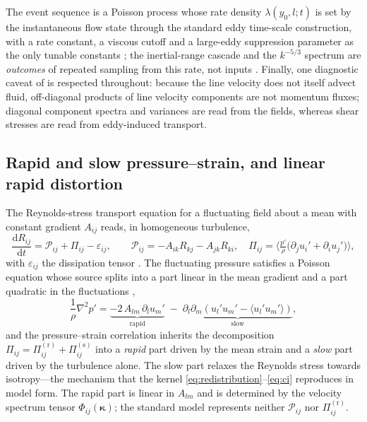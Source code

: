 \documentclass[lineno]{JFM-FLM_Au}
\begin{document}
The event sequence is a Poisson process whose rate density
$\lambda(y_0,l;t)$ is set by the instantaneous flow state through the
standard eddy time-scale construction, with a rate constant, a viscous
cutoff and a large-eddy suppression parameter as the only tunable
constants \citep{Kerstein1999,StephensLignell2021}; the inertial-range
cascade and the $k^{-5/3}$ spectrum are \emph{outcomes} of repeated
sampling from this rate, not inputs \citep{Kerstein1999}. Finally, one
diagnostic caveat of \citet{Kerstein2001} is respected throughout:
because the line velocity does not itself advect fluid, off-diagonal
products of line velocity components are not momentum fluxes; diagonal
component spectra and variances are read from the fields, whereas shear
stresses are read from eddy-induced transport.

\subsection{Rapid and slow pressure--strain, and linear rapid
distortion}\label{sec:rapid-slow}

The Reynolds-stress transport equation for a fluctuating field about a
mean with constant gradient $A_{ij}$ reads, in homogeneous turbulence,
\begin{equation}
  \frac{\mathrm{d}R_{ij}}{\mathrm{d}t}
  = \mathcal{P}_{ij} + \Pi_{ij} - \varepsilon_{ij},
  \qquad
  \mathcal{P}_{ij}=-A_{ik}R_{kj}-A_{jk}R_{ki},
  \quad
  \Pi_{ij}=\Big\langle \tfrac{p'}{\rho}
            \big(\partial_j u_i'+\partial_i u_j'\big)\Big\rangle,
  \label{eq:rstransport}
\end{equation}
with $\varepsilon_{ij}$ the dissipation tensor \citep{Pope2000}. The
fluctuating pressure satisfies a Poisson equation whose source splits
into a part linear in the mean gradient and a part quadratic in the
fluctuations \citep{Pope2000},
\begin{equation}
  \frac{1}{\rho}\nabla^2 p'
  = \underbrace{-2\,A_{lm}\,\partial_l u_m'}_{\text{rapid}}
    \;-\;
    \underbrace{\partial_l\partial_m\!\left(u_l' u_m'
     -\langle u_l' u_m'\rangle\right)}_{\text{slow}} ,
  \label{eq:poisson}
\end{equation}
and the pressure--strain correlation inherits the decomposition
$\Pi_{ij}=\Pi^{(\mathrm r)}_{ij}+\Pi^{(\mathrm s)}_{ij}$ into a
\emph{rapid} part driven by the mean strain and a \emph{slow} part driven
by the turbulence alone. The slow part relaxes the Reynolds stress
towards isotropy---the mechanism that the kernel
\eqref{eq:redistribution}--\eqref{eq:ci} reproduces in model form. The
rapid part is linear in $A_{lm}$ and is determined by the velocity
spectrum tensor $\Phi_{ij}(\boldsymbol{\kappa})$; the standard model
represents neither $\mathcal{P}_{ij}$ nor $\Pi^{(\mathrm r)}_{ij}$.
\end{document}
